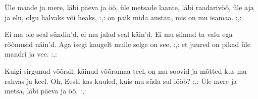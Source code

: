 \"Ule maade ja mere, l\"abi p\"aeva ja \"o\"o,
\"ule metsade laante, l\"abi raadariv\"o\"o,
\"ule aja ja elu, olgu halvaks v\~oi heaks,
:,: on paik mida austan, mis on mu isamaa. :,:

Ei ma ole seal s\"undin'd, ei mu jalad seal k\"ain'd.
Ei mu silmad ta valu ega r\~o\~omusid n\"ain'd.
Aga isegi kaugelt mulle selge on see,
:,: et juured on pikad \"ule mandri ja vee. :,:

Kuigi sirgunud v\~o\~orsil, k\"ainud v\~o\~oramaa teel,
on mu soovid ja m\~otted kus mu rahvas ja keel.
Oh, Eesti kas kuuled, kuis mu s\"uda sul l\"o\"ob?
:,: \"Ule mere ja metsa, l\"abi p\"aeva ja \"o\"o. :,: